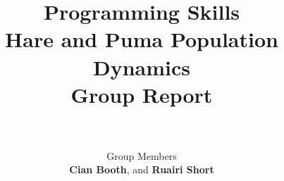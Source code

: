 \documentclass[12pt]{article}    %
\title{\textbf{Programming Skills}\\Hare and Puma Population Dynamics\\Group Report}  %
\author{\\\\Group Members\\\textbf{Cian Booth}, \textbf{\pa} and \textbf{Ruairi Short}}     %
\date{}   %
\numberwithin{equation}{section}
\begin{document}

\maketitle                 %
\begin{center}

\abstract{}
\clearpage
{}
\end{center}

\newpage











\end{document}
